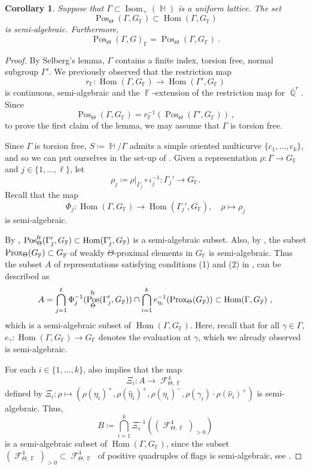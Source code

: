 \documentclass{amsart}
\theoremstyle{plain}
\newtheorem{corollary}[proposition]{Corollary}
\theoremstyle{definition}
\DeclareMathOperator{\Hom}{Hom}
\DeclareMathOperator{\Isom}{Isom}
\DeclareMathOperator{\Pos}{Pos}
\DeclareMathOperator{\Fc}{\mathcal{F}}
\DeclareMathOperator{\Fb}{{\mathbb{F}}}
\DeclareMathOperator{\Hb}{\mathbb{H}}
\DeclareMathOperator{\Qb}{\mathbb{Q}}
\newcommand{\fr}{\textnormal{fr}}
\newcommand{\Prox}{\textnormal{Prox}}
\newcommand{\Qbar}{\overline{\Qb}^r}
\newcommand{\1}{\mathbf{1}}
\begin{document}
\begin{corollary}
\label{corol : positive semi algebraic}
    Suppose that $\Gamma\subset \Isom_+(\Hb)$ is a uniform lattice. The set
    \[\Pos_\Theta(\Gamma, G_{\Fb})\subset \Hom(\Gamma,G_{\Fb})\]
    is semi-algebraic. Furthermore,
    \[\Pos_\Theta(\Gamma,G)_{\Fb} = \Pos_\Theta(\Gamma,G_{\Fb})~.\]
\end{corollary}
\begin{proof}
By Selberg's lemma, $\Gamma$ contains a finite index, torsion free, normal subgroup $\Gamma'$. We previously observed that the restriction map
\[r_{\Fb}\colon\Hom(\Gamma,G_{\Fb})\to\Hom(\Gamma',G_{\Fb})\]
is continuous, semi-algebraic and the $\Fb$-extension of the restriction map for $\Qbar$.
Since
\[\Pos_\Theta(\Gamma,G_{\Fb})=r_{\Fb}^{-1}(\Pos_\Theta(\Gamma',G_{\Fb}))~,\]
to prove the first claim of the lemma, we may assume that $\Gamma$ is torsion free.

Since $\Gamma$ is torsion free, $S\coloneqq \Hb/\Gamma$ admits a simple oriented multicurve $\{c_1,\dots,c_k\}$, and so we can put ourselves in the set-up of . Given a representation $\rho:\Gamma\to G_{\Fb}$ and $j\in\{1,\dots,\ell\}$, let 
\[\rho_j\coloneqq \rho|_{\Gamma_j}\circ\iota_j^{-1}:\Gamma_j'\to G_{\Fb}.\] 
Recall that the map 
\[\Phi_j:\Hom(\Gamma,G_{\Fb})\to\Hom(\Gamma_j',G_{\Fb}), \quad \rho\mapsto \rho_j\]
is semi-algebraic.

By , $\Pos_\Theta^{\fr}(\Gamma_j',G_{\Fb})\subset \Hom(\Gamma_j',G_{\Fb})$
    is a semi-algebraic subset. Also, by , the subset $\Prox_\Theta(G_{\Fb})\subset G_{\Fb}$ of weakly $\Theta$-proximal elements in $G_{\Fb}$ is semi-algebraic. Thus the subset $A$ of representations satisfying conditions (1) and (2) in , can be described as
    \[A=\bigcap_{j=1}^\ell\Phi_j^{-1}(\Pos_\Theta^{\fr}(\Gamma_j',G_{\Fb}))\cap\bigcap_{i=1}^ke_{\eta_i}^{-1}(\Prox_\Theta(G_{\Fb}))\subset\Hom(\Gamma,G_{\Fb})~,\]
    which is a semi-algebraic subset of $\Hom(\Gamma,G_{\Fb})$. Here, recall that for all $\gamma\in\Gamma$,\break $e_\gamma\colon \Hom(\Gamma,G_{\Fb})\to G_{\Fb}$ denotes the evaluation at $\gamma$, which we already observed is semi-algebraic.

For each $i\in\{1,\dots,k\}$,  also implies that the map
\[\Xi_i \colon A\to\Fc_{\Theta,\Fb}^4\]
defined by $\Xi_i \colon \rho\mapsto\left(\rho(\eta_i)^+,\rho(\hat\eta_i)^+,\rho(\eta_i)^-,\rho(\gamma_i)\cdot \rho(\hat\nu_i)^+\right)$ is semi-algebraic. Thus,
\[B \coloneqq \bigcap_{i=1}^k\Xi_i^{-1}((\Fc_{\Theta,\Fb}^4)_{>0})\]
is a semi-algebraic subset of $\Hom(\Gamma,G_{\Fb})$, since the subset $(\Fc_{\Theta,\Fb}^4)_{>0}\subset\Fc_{\Theta,\Fb}^4$ of positive quadruples of flags is semi-algebraic, see .



\end{proof}
\end{document}
